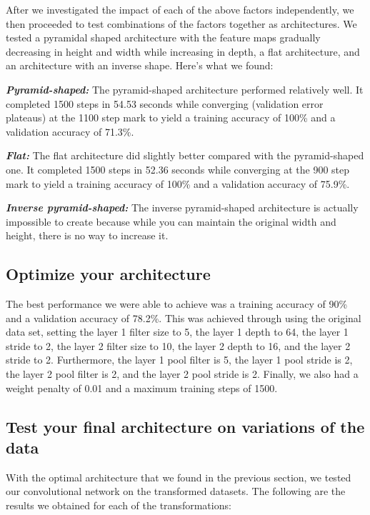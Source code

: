 \documentclass{article}
\begin{document}
After we investigated the impact of each of the above factors independently, we then proceeded to test combinations of the factors together as architectures. We tested a pyramidal shaped architecture with the feature maps gradually decreasing in height and width while increasing in depth, a flat architecture, and an architecture with an inverse shape. Here's what we found:


\textbf{\textit{Pyramid-shaped:}}
The pyramid-shaped architecture performed relatively well. It completed 1500 steps in 54.53 seconds while converging (validation error plateaus) at the 1100 step mark to yield a training accuracy of 100\% and a validation accuracy of 71.3\%.


\textbf{\textit{Flat:}}
The flat architecture did slightly better compared with the pyramid-shaped one. It completed 1500 steps in 52.36 seconds while converging at the 900 step mark to yield a training accuracy of 100\% and a validation accuracy of 75.9\%. 


\textbf{\textit{Inverse pyramid-shaped:}}
The inverse pyramid-shaped architecture is actually impossible to create because while you can maintain the original width and height, there is no way to increase it.

\subsection{Optimize your architecture}
The best performance we were able to achieve was a training accuracy of 90\% and a validation accuracy of 78.2\%.  This was achieved through using the original data set, setting the layer 1 filter size to 5, the layer 1 depth to 64, the layer 1 stride to 2, the layer 2 filter size to 10, the layer 2 depth to 16, and the layer 2 stride to 2. Furthermore, the layer 1 pool filter is 5, the layer 1 pool stride is 2, the layer 2 pool filter is 2, and the layer 2 pool stride is 2. Finally, we also had a weight penalty of 0.01 and a maximum training steps of 1500. 

\subsection{Test your final architecture on variations of the data}
With the optimal architecture that we found in the previous section, we tested our convolutional network on the transformed datasets. The following are the results we obtained for each of the transformations:
\end{document}

